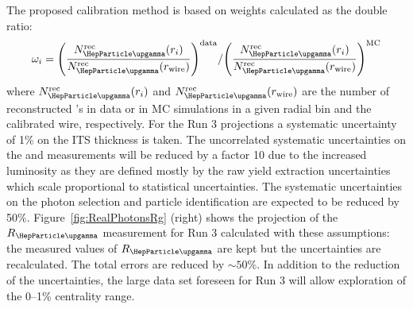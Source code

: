 The proposed calibration method is based on weights calculated 
as the double ratio: 
\begin{equation}
\omega_i= 
{\left(\frac{N_{\PGg}^{\rm rec}(r_i)}{N_{\PGg}^{\rm rec}(r_{\rm wire})}\right)^{\rm data}} /
{\left(\frac{N_{\PGg}^{\rm rec}(r_i)}{N_{\PGg}^{\rm rec}(r_{\rm wire})}\right)^{\rm MC}} 
\end{equation}
where $N_{\PGg}^{\rm rec}(r_i)$ and $N_{\PGg}^{\rm rec}(r_{\rm wire})$ are the number of reconstructed \PGg 's in data or in MC simulations in a given radial bin and the calibrated wire, respectively.
For the Run 3 projections a systematic uncertainty of 1\% on the ITS thickness is taken. The uncorrelated systematic uncertainties on the \PGpz and \PGh measurements will be reduced by a factor 10 due to the increased luminosity as they are defined mostly by the raw yield extraction uncertainties which scale proportional to statistical uncertainties. 
The systematic uncertainties on the photon selection and particle identification are expected to be reduced by 50\%.
Figure~\ref{fig:RealPhotonsRg} (right) shows the projection of the $R_{\PGg}$ measurement 
for Run 3 calculated with these assumptions: the measured values of $R_{\PGg}$ are kept but the uncertainties are recalculated. The total errors are reduced by $\sim50$\%. In addition to the reduction of the uncertainties, the large data set foreseen for Run 3 will allow exploration of the 0--1\% centrality range. 



